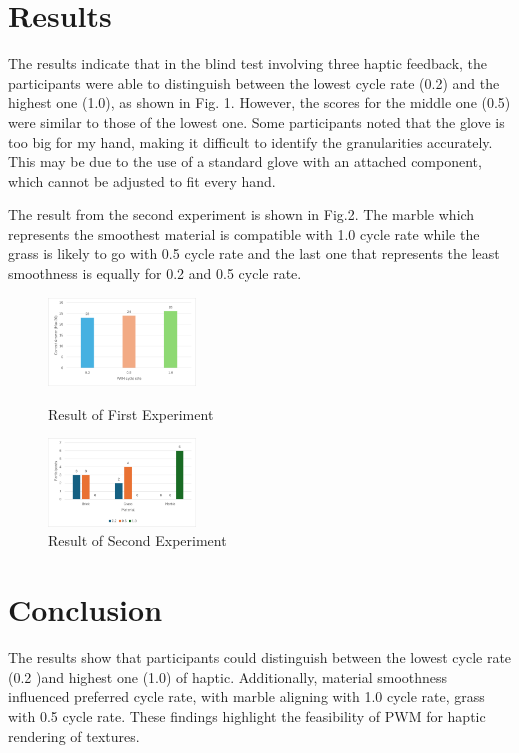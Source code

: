 \documentclass[a4paper,twocolumn]{article}
\begin{document}
\section{Results}
The results indicate that in the blind test involving three haptic feedback, the  participants were able to distinguish between the lowest cycle rate (0.2) and the highest one (1.0), as shown in Fig. 1. However, the scores for the middle one (0.5) were similar to those of the lowest one. Some participants noted that the glove is too big for my hand, making it difficult to identify the granularities accurately. This may be due to the use of a standard glove with an attached component, which cannot be adjusted to fit every hand.\par
The result from the second experiment is shown in Fig.2. The marble which represents the smoothest material is compatible with 1.0 cycle rate while the grass is likely to go with 0.5 cycle rate and the last one that represents the least smoothness is equally for 0.2 and 0.5 cycle rate.

\begin{figure}[h]
  \centering
  \includegraphics[width=0.35\textwidth]{./Fig/PWM_Correct_Test.png}
  \caption{{Result of First Experiment}}
  \label{fig1}
  \vspace{0.1cm}
  \centering
  \includegraphics[width=0.35\textwidth]{./Fig/Texture_Select_Test.png}
  \caption{{Result of Second Experiment}}
  \label{fig2}
\end{figure}


\section{Conclusion}
The results show that participants could distinguish between the lowest cycle rate (0.2 )and highest one (1.0) of haptic. Additionally, material smoothness influenced preferred cycle rate, with marble aligning with 1.0 cycle rate, grass with 0.5 cycle rate. These findings highlight the feasibility of PWM for haptic rendering of textures.
\end{document}
